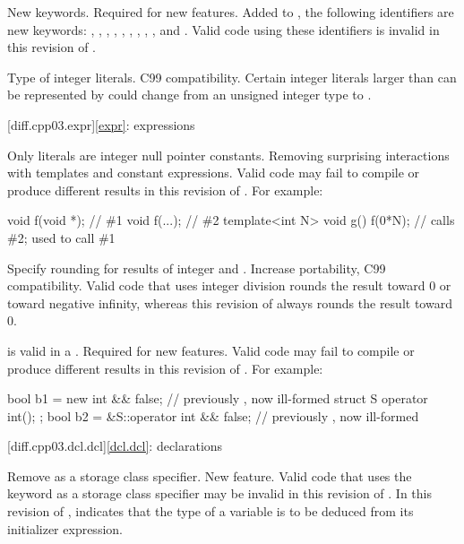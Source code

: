 \change
New keywords.
\rationale
Required for new features.
\effect
Added to , the following identifiers are new keywords:
,
,
,
,
,
,
,
,
,
and
.
Valid \CppIII{} code using these identifiers is invalid in this revision of \Cpp{}.

\change
Type of integer literals.
\rationale
C99 compatibility.
\effect
Certain integer literals larger than can be represented by  could
change from an unsigned integer type to .

[diff.cpp03.expr]{\ref{expr}: expressions}

\change
Only literals are integer null pointer constants.
\rationale
Removing surprising interactions with templates and constant
expressions.
\effect
Valid \CppIII{} code may fail to compile or produce different results in
this revision of \Cpp{}.
For example:
\begin{codeblock}
void f(void *);     // \#1
void f(...);        // \#2
template<int N> void g() {
  f(0*N);           // calls \#2; used to call \#1
}
\end{codeblock}

\change
Specify rounding for results of integer \tcode{/} and \tcode{\%}.
\rationale
Increase portability, C99 compatibility.
\effect
Valid \CppIII{} code that uses integer division rounds the result toward 0 or
toward negative infinity, whereas this revision of \Cpp{} always rounds
the result toward 0.

\change
\tcode{\&\&} is valid in a .
\rationale
Required for new features.
\effect
Valid \CppIII{} code may fail to compile or produce different results in
this revision of \Cpp{}.
For example:
\begin{codeblock}
bool b1 = new int && false;             // previously , now ill-formed
struct S { operator int(); };
bool b2 = &S::operator int && false;    // previously , now ill-formed
\end{codeblock}

[diff.cpp03.dcl.dcl]{\ref{dcl.dcl}: declarations}

\change
Remove  as a storage class specifier.
\rationale
New feature.
\effect
Valid \CppIII{} code that uses the keyword  as a storage class
specifier
may be invalid in this revision of \Cpp{}.
In this revision of \Cpp{},
 indicates that the type of a variable is to be deduced
from its initializer expression.

